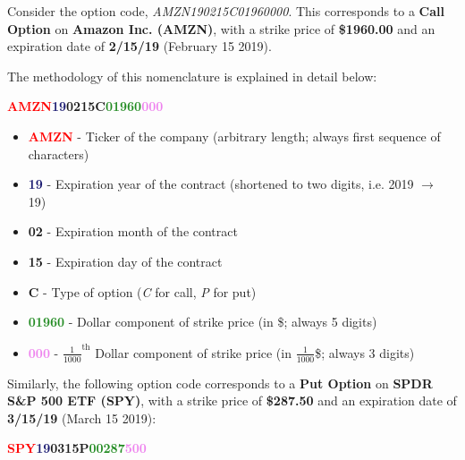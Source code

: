 \documentclass[10pt]{article}
\begin{document}
        Consider the option code, \textit{AMZN190215C01960000}. This corresponds to a \textbf{Call Option} on \textbf{Amazon Inc. (AMZN)}, with a strike price of \textbf{\$1960.00} and an expiration date of \textbf{2/15/19} (February 15 2019).
        
        The methodology of this nomenclature is explained in detail below:
    
        \begin{center}
            \textbf{\textcolor{red}{AMZN}\textcolor{MidnightBlue}{19}\textcolor{Bittersweet}{02}\textcolor{YellowOrange}{15}\textcolor{RoyalPurple}{C}\textcolor{ForestGreen}{01960}\textcolor{violet}{000}}
        \end{center}
    
        \begin{itemize}
            \item \textbf{\textcolor{red}{AMZN}} - Ticker of the company (arbitrary length; always first sequence of characters)
            \item \textbf{\textcolor{MidnightBlue}{19}} - Expiration year of the contract (shortened to two digits, i.e. 2019 $\rightarrow$ 19)
            \item \textbf{\textcolor{Bittersweet}{02}} - Expiration month of the contract
            \item \textbf{\textcolor{YellowOrange}{15}} - Expiration day of the contract
            \item \textbf{\textcolor{RoyalPurple}{C}} - Type of option (\textit{C} for call, \textit{P} for put)
            \item \textbf{\textcolor{ForestGreen}{01960}} - Dollar component of strike price (in \$; always 5 digits)
            \item \textbf{\textcolor{violet}{000}} - ${\frac{1}{1000}}^\text{th}$ Dollar component of strike price (in $\frac{1}{1000}$\$; always 3 digits)
        \end{itemize}
    
        Similarly, the following option code corresponds to a \textbf{Put Option} on \textbf{SPDR S\&P 500 ETF (SPY)}, with a strike price of \textbf{\$287.50} and an expiration date of \textbf{3/15/19} (March 15 2019):
    
        \begin{center}
            \textbf{\textcolor{red}{SPY}\textcolor{MidnightBlue}{19}\textcolor{Bittersweet}{03}\textcolor{YellowOrange}{15}\textcolor{RoyalPurple}{P}\textcolor{ForestGreen}{00287}\textcolor{violet}{500}}
        \end{center}
    
\end{document}
